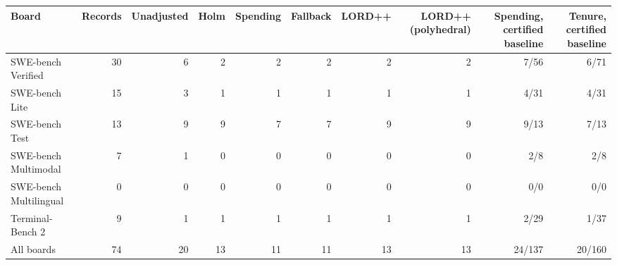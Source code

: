 \begin{tabular}{lrrrrrrrrr}
\toprule
Board & Records & Unadjusted & Holm & Spending & Fallback & LORD++ & LORD++ (polyhedral) & Spending, certified baseline & Tenure, certified baseline \\
\midrule
SWE-bench Verified & 30 & 6 & 2 & 2 & 2 & 2 & 2 & 7/56 & 6/71 \\
SWE-bench Lite & 15 & 3 & 1 & 1 & 1 & 1 & 1 & 4/31 & 4/31 \\
SWE-bench Test & 13 & 9 & 9 & 7 & 7 & 9 & 9 & 9/13 & 7/13 \\
SWE-bench Multimodal & 7 & 1 & 0 & 0 & 0 & 0 & 0 & 2/8 & 2/8 \\
SWE-bench Multilingual & 0 & 0 & 0 & 0 & 0 & 0 & 0 & 0/0 & 0/0 \\
Terminal-Bench 2 & 9 & 1 & 1 & 1 & 1 & 1 & 1 & 2/29 & 1/37 \\
\midrule
All boards & 74 & 20 & 13 & 11 & 11 & 13 & 13 & 24/137 & 20/160 \\
\bottomrule
\end{tabular}
